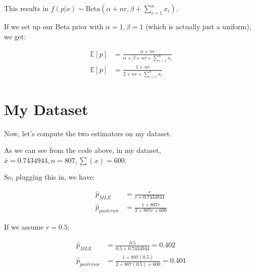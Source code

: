 \documentclass[
  letterpaper,
  DIV=11,
  numbers=noendperiod]{scrreprt}
\newenvironment{Shaded}{\begin{snugshade}}{\end{snugshade}}
\newcommand{\NormalTok}[1]{\textcolor[rgb]{0.00,0.23,0.31}{#1}}
\begin{document}
This results in
\(f(p | x) \sim \text{Beta}(\alpha + nr, \beta + \sum_{i=1}^n x_i)\).

If we set up our Beta prior with \(\alpha=1, \beta = 1\) (which is
actually just a uniform), we get:

\[
\begin{aligned}
    \mathbb{E}[p] &= \frac{\alpha + nr}{\alpha + \beta + nr + \sum_{i=1}^n x_i} \\
    \mathbb{E}[p] &= \frac{1 + nr}{2 + nr + \sum_{i=1}^n x_i}
\end{aligned}
\]

\section{My Dataset}\label{my-dataset}

Now, let's compute the two estimators on my dataset.

\begin{Shaded}
\end{Shaded}

As we can see from the code above, in my dataset,
\(\bar{x} = 0.7434944, n=807, \sum(x) = 600\).

So, plugging this in, we have:

\[
\begin{aligned}
    \hat{p}_{MLE} &= \frac{r}{r + 0.7434944} \\
    \hat{p}_{posterior} &= \frac{1 + 807r}{2 + 807r + 600}
\end{aligned}
\]

If we assume \(r = 0.5\):

\[
\begin{aligned}
    \hat{p}_{MLE} &= \frac{0.5}{0.5 + 0.7434944 } = 0.402 \\
    \hat{p}_{posterior} &= \frac{1 + 807(0.5)}{2 + 807(0.5) + 600} = 0.401
\end{aligned}
\]
\end{document}
